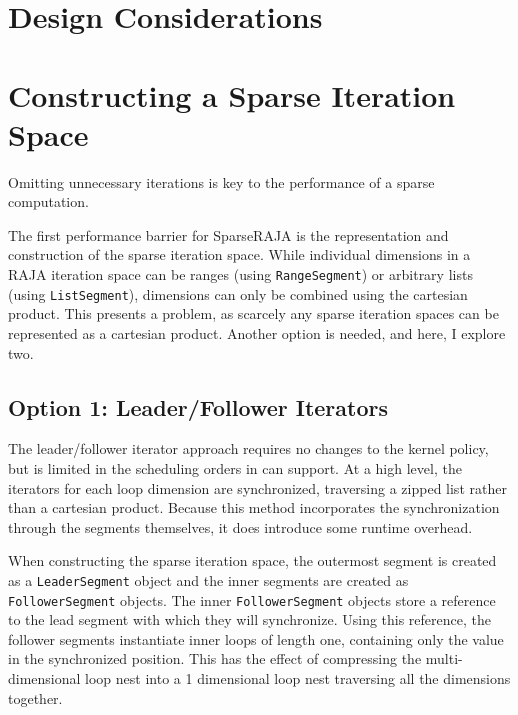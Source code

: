 \section{Design Considerations}

\section{Constructing a Sparse Iteration Space}

Omitting unnecessary iterations is key to the performance of a sparse computation. 


The first performance barrier for SparseRAJA is the representation and construction of the sparse iteration space.
While individual dimensions in a RAJA iteration space can be ranges (using \verb.RangeSegment.) or arbitrary lists (using \verb.ListSegment.), dimensions can only be combined using the cartesian product. 
This presents a problem, as scarcely any sparse iteration spaces can be represented as a cartesian product.
Another option is needed, and here, I explore two.

\subsection{Option 1: Leader/Follower Iterators}

The leader/follower iterator approach requires no changes to the kernel policy, but is limited in the scheduling orders in can support. 
At a high level, the iterators for each loop dimension are synchronized, traversing a zipped list rather than a cartesian product. 
Because this method incorporates the synchronization through the segments themselves, it does introduce some runtime overhead.

When constructing the sparse iteration space, the outermost segment is created as a \verb.LeaderSegment. object and the inner segments are created as \verb.FollowerSegment. objects.
The inner \verb.FollowerSegment. objects store a reference to the lead segment with which they will synchronize.
Using this reference, the follower segments instantiate inner loops of length one, containing only the value in the synchronized position. 
This has the effect of compressing the multi-dimensional loop nest into a 1 dimensional loop nest traversing all the dimensions together.


